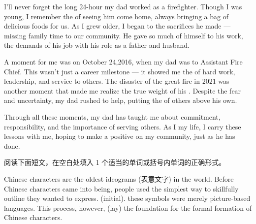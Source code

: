 \documentclass{英语试卷}
\begin{document}
\par I'll never forget the long 24-hour  my dad worked as a firefighter. Though I was young, I remember the  of seeing him come home, always bringing a bag of delicious foods for us. As I grew older, I began to  the sacrifices he made — missing family time to  our community. He gave so much of himself to his work,  the demands of his job with his role as a father and husband.\par
\par A  moment for me was on October 24,2016, when my dad was  to Assistant Fire Chief. This wasn't just a career milestone — it showed me the  of hard work, leadership, and service to others. The disaster of the great fire in 2021 was another moment that made me realize the true weight of his . Despite the fear and uncertainty, my dad rushed to help, putting the  of others above his own.\par
\par Through all these moments, my dad has taught me about commitment, responsibility, and the importance of serving others. As I  my life, I carry these lessons with me, hoping to make a positive  on my community, just as he has done.\par
{}
\par 阅读下面短文，在空白处填入 1 个适当的单词或括号内单词的正确形式。\par
\par Chinese characters are the oldest ideograms (表意文字) in the world. Before Chinese characters came into being, people used the simplest way to skillfully outline  they wanted to express.  (initial). these symbols were merely picture-based languages. This process, however,  (lay) the foundation for the formal formation of Chinese characters.\par
\end{document}
